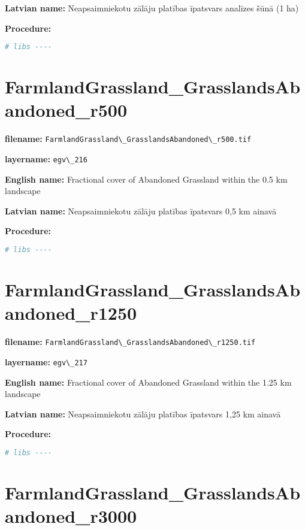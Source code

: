\documentclass[
]{book}
\newcommand{\passthrough}[1]{#1}
\begin{document}
\textbf{Latvian name:} Neapsaimniekotu zālāju platības īpatsvars analīzes šūnā (1 ha)

\textbf{Procedure:}

\begin{lstlisting}[language=R]
# libs ----
\end{lstlisting}

\section{FarmlandGrassland\_GrasslandsAbandoned\_r500}\label{ch06.216}

\textbf{filename:} \passthrough{\lstinline!FarmlandGrassland\_GrasslandsAbandoned\_r500.tif!}

\textbf{layername:} \passthrough{\lstinline!egv\_216!}

\textbf{English name:} Fractional cover of Abandoned Grassland within the 0.5 km landscape

\textbf{Latvian name:} Neapsaimniekotu zālāju platības īpatsvars 0,5 km ainavā

\textbf{Procedure:}

\begin{lstlisting}[language=R]
# libs ----
\end{lstlisting}

\section{FarmlandGrassland\_GrasslandsAbandoned\_r1250}\label{ch06.217}

\textbf{filename:} \passthrough{\lstinline!FarmlandGrassland\_GrasslandsAbandoned\_r1250.tif!}

\textbf{layername:} \passthrough{\lstinline!egv\_217!}

\textbf{English name:} Fractional cover of Abandoned Grassland within the 1.25 km landscape

\textbf{Latvian name:} Neapsaimniekotu zālāju platības īpatsvars 1,25 km ainavā

\textbf{Procedure:}

\begin{lstlisting}[language=R]
# libs ----
\end{lstlisting}

\section{FarmlandGrassland\_GrasslandsAbandoned\_r3000}\label{ch06.218}
\end{document}
